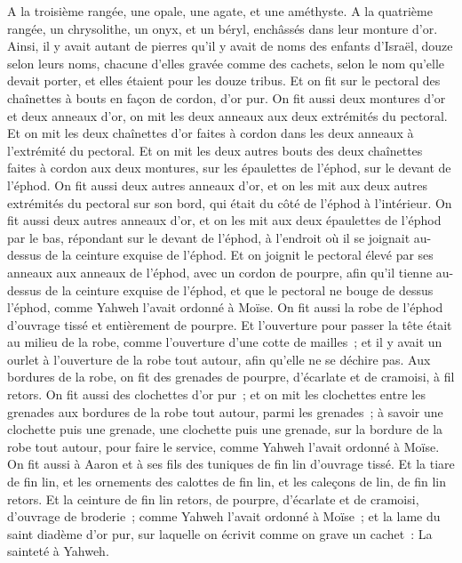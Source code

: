 \begin{multicols}{2}
A la troisième rangée, une opale, une agate, et une améthyste.
A la quatrième rangée, un chrysolithe, un onyx, et un béryl, enchâssés dans leur monture d'or.
Ainsi, il y avait autant de pierres qu'il y avait de noms des enfants d'Israël, douze selon leurs noms, chacune d'elles gravée comme des cachets, selon le nom qu'elle devait porter, et elles étaient pour les douze tribus.
Et on fit sur le pectoral des chaînettes à bouts en façon de cordon, d'or pur.
On fit aussi deux montures d'or et deux anneaux d'or, on mit les deux anneaux aux deux extrémités du pectoral.
Et on mit les deux chaînettes d'or faites à cordon dans les deux anneaux à l'extrémité du pectoral.
Et on mit les deux autres bouts des deux chaînettes faites à cordon aux deux montures, sur les épaulettes de l'éphod, sur le devant de l'éphod.
On fit aussi deux autres anneaux d'or, et on les mit aux deux autres extrémités du pectoral sur son bord, qui était du côté de l'éphod à l'intérieur.
On fit aussi deux autres anneaux d'or, et on les mit aux deux épaulettes de l'éphod par le bas, répondant sur le devant de l'éphod, à l'endroit où il se joignait au-dessus de la ceinture exquise de l'éphod.
Et on joignit le pectoral élevé par ses anneaux aux anneaux de l'éphod, avec un cordon de pourpre, afin qu'il tienne au-dessus de la ceinture exquise de l'éphod, et que le pectoral ne bouge de dessus l'éphod, comme Yahweh l'avait ordonné à Moïse.
On fit aussi la robe de l'éphod d'ouvrage tissé et entièrement de pourpre.
 Et l'ouverture pour passer la tête était au milieu de la robe, comme l'ouverture d'une cotte de mailles~; et il y avait un ourlet à l'ouverture de la robe tout autour, afin qu'elle ne se déchire pas.
Aux bordures de la robe, on fit des grenades de pourpre, d'écarlate et de cramoisi, à fil retors.
On fit aussi des clochettes d'or pur~; et on mit les clochettes entre les grenades aux bordures de la robe tout autour, parmi les grenades~;
à savoir une clochette puis une grenade, une clochette puis une grenade, sur la bordure de la robe tout autour, pour faire le service, comme Yahweh l'avait ordonné à Moïse.
On fit aussi à Aaron et à ses fils des tuniques de fin lin d'ouvrage tissé.
Et la tiare de fin lin, et les ornements des calottes de fin lin, et les caleçons de lin, de fin lin retors.
Et la ceinture de fin lin retors, de pourpre, d'écarlate et de cramoisi, d'ouvrage de broderie~; comme Yahweh l'avait ordonné à Moïse~;
et la lame du saint diadème d'or pur, sur laquelle on écrivit comme on grave un cachet~: La sainteté à Yahweh.

\end{multicols}
